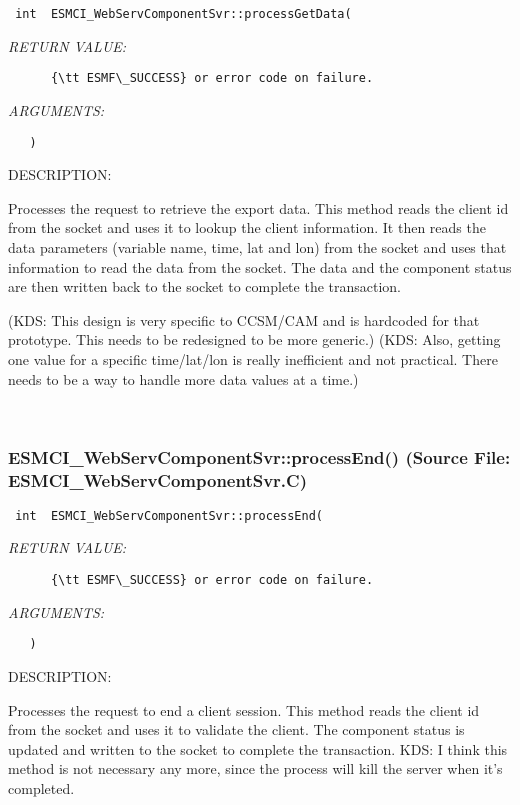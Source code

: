   
\begin{verbatim} int  ESMCI_WebServComponentSvr::processGetData(\end{verbatim}{\em RETURN VALUE:}
\begin{verbatim}      {\tt ESMF\_SUCCESS} or error code on failure.\end{verbatim}{\em ARGUMENTS:}
\begin{verbatim}   )\end{verbatim}
{\sf DESCRIPTION:\\ }


      Processes the request to retrieve the export data.  This method
      reads the client id from the socket and uses it to lookup the client
      information.  It then reads the data parameters (variable name, time,
      lat and lon) from the socket and uses that information to read the
      data from the socket.  The data and the component status are then
      written back to the socket to complete the transaction.
  
      (KDS: This design is very specific to CCSM/CAM and is hardcoded for
            that prototype.  This needs to be redesigned to be more generic.)
      (KDS: Also, getting one value for a specific time/lat/lon is really
            inefficient and not practical.  There needs to be a way to handle
            more data values at a time.)
   
 
\mbox{}\hrulefill\
 
\subsubsection{ESMCI\_WebServComponentSvr::processEnd() (Source File: ESMCI\_WebServComponentSvr.C)}


  
\begin{verbatim} int  ESMCI_WebServComponentSvr::processEnd(\end{verbatim}{\em RETURN VALUE:}
\begin{verbatim}      {\tt ESMF\_SUCCESS} or error code on failure.\end{verbatim}{\em ARGUMENTS:}
\begin{verbatim}   )\end{verbatim}
{\sf DESCRIPTION:\\ }


      Processes the request to end a client session.  This method reads the
      client id from the socket and uses it to validate the client.
      The component status is updated and written to the socket to complete
      the transaction.
      KDS: I think this method is not necessary any more, since the process
           will kill the server when it's completed.
   
